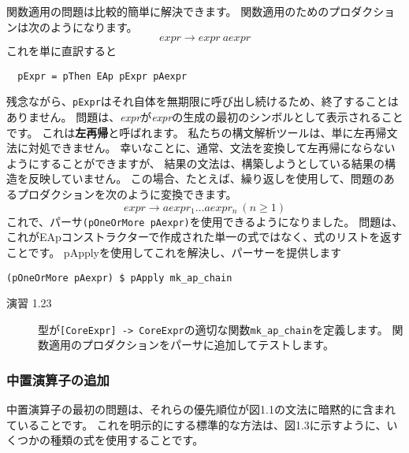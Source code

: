 \documentclass{jarticle}
\begin{document}
関数適用の問題は比較的簡単に解決できます。
関数適用のためのプロダクションは次のようになります。
\[ expr \rightarrow expr ~ aexpr \]
これを単に直訳すると

\begin{verbatim}
  pExpr = pThen EAp pExpr pAexpr
\end{verbatim}

残念ながら、\texttt{pExpr}はそれ自体を無期限に呼び出し続けるため、終了することはありません。
問題は、\textit{expr}が\textit{expr}の生成の最初のシンボルとして表示されることです。
これは\textbf{左再帰}と呼ばれます。
私たちの構文解析ツールは、単に左再帰文法に対処できません。
幸いなことに、通常、文法を変換して左再帰にならないようにすることができますが、
結果の文法は、構築しようとしている結果の構造を反映していません。
この場合、たとえば、繰り返しを使用して、問題のあるプロダクションを次のように変換できます。
\[ expr \rightarrow aexpr_1 \ldots aexpr_n ~ (n \geq 1) \]
これで、パーサ\texttt{(pOneOrMore pAexpr)}を使用できるようになりました。
問題は、これがEApコンストラクターで作成された単一の式ではなく、式のリストを返すことです。
pApplyを使用してこれを解決し、パーサーを提供します

\begin{verbatim}
(pOneOrMore pAexpr) $ pApply mk_ap_chain
\end{verbatim}

\begin{description}
	\item[演習 1.23] 型が\texttt{[CoreExpr] -> CoreExpr}の適切な関数\texttt{mk\_ap\_chain}を定義します。
	      関数適用のプロダクションをパーサに追加してテストします。
\end{description}

\subsubsection{中置演算子の追加}

中置演算子の最初の問題は、それらの優先順位が図1.1の文法に暗黙的に含まれていることです。
これを明示的にする標準的な方法は、図1.3に示すように、いくつかの種類の式を使用することです。
\end{document}
